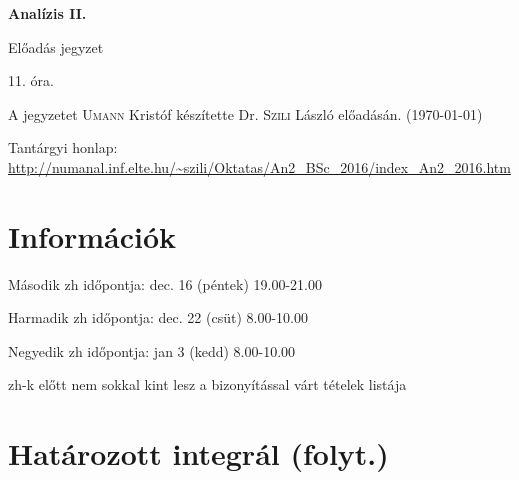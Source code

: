 \documentclass[a4paper,11.5pt]{article}
\begin{document}
	\setlength\parindent{0pt}
	\def\s{\hspace{0.2mm}\vphantom{\beta}}
	\def\Z{\mathbb{Z}}
	\def\Q{\mathbb{Q}}
	\def\R{\mathbb{R}}
	\def\C{\mathbb{C}}
	\def\N{\mathbb{N}}
	\def\Ra{\overline{\mathbb{R}}}
	
	\def\sume{\displaystyle\sum_{n=1}^{+\infty}}
	\def\sumn{\displaystyle\sum_{n=0}^{+\infty}}
	
	\def\narrow{\underset{n\rightarrow+\infty}{\longrightarrow}}
	\def\limn{\displaystyle\lim_{n\to +\infty}}
	\def\limx{\displaystyle\lim_{x\to +\infty}}
	
	
	\theoremstyle{definition}
	\newtheorem{theorem}{Tétel}[subsection] 
	
	\theoremstyle{definition}
	\newtheorem{definition}[theorem]{Definíció} 
	\newtheorem{example}[theorem]{Példa} 
	\newtheorem{task}[theorem]{Feladat} 
	\newtheorem{note}[theorem]{Megjegyzés}
	\newtheorem{revision}[theorem]{Emlékeztető}
	\begin{center}
		{\LARGE\textbf{Analízis II.}}
		
		{\Large Előadás jegyzet}
		
		11. óra.
	\end{center}
	A jegyzetet \textsc{Umann} Kristóf készítette Dr. \textsc{Szili} László  előadásán. (\today)
	
	
	Tantárgyi honlap: \url{http://numanal.inf.elte.hu/~szili/Oktatas/An2_BSc_2016/index_An2_2016.htm}
	\section{Információk}
	
	
	\begin{compactitem}
		\item Második zh időpontja: dec. 16 (péntek) 19.00-21.00
		\item Harmadik zh időpontja: dec. 22 (csüt) 8.00-10.00
		\item Negyedik zh időpontja: jan 3 (kedd) 8.00-10.00
		\item zh-k előtt nem sokkal kint lesz a bizonyítással várt tételek listája
	\end{compactitem}
	
	\section{Határozott integrál (folyt.)}
	
\end{document}
